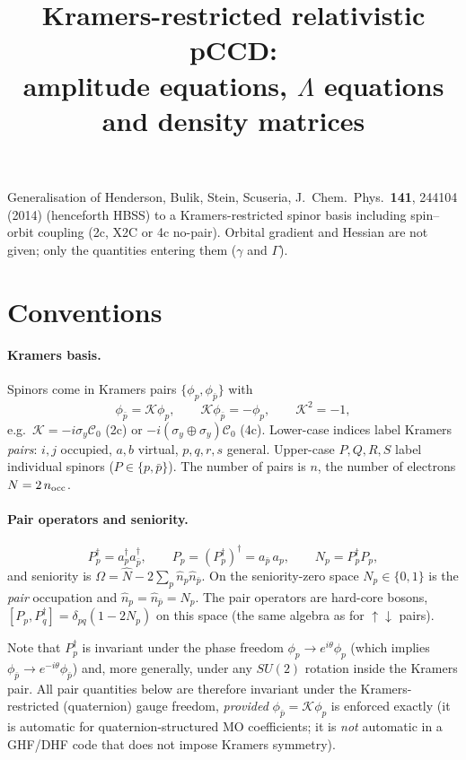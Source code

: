 \documentclass[11pt,a4paper]{article}
\title{Kramers-restricted relativistic pCCD:\\ amplitude equations, $\Lambda$ equations and density matrices}
\author{}
\date{}
\newcommand{\kb}[1]{\bar{#1}}                 %
\newcommand{\Pd}[1]{P^{\dagger}_{#1}}
\newcommand{\Pa}[1]{P_{#1}}
\begin{document}
\maketitle

\noindent Generalisation of Henderson, Bulik, Stein, Scuseria, J.~Chem.~Phys.~\textbf{141}, 244104 (2014)
(henceforth HBSS) to a Kramers-restricted spinor basis including spin--orbit coupling
(2c, X2C or 4c no-pair). Orbital gradient and Hessian are not given; only the quantities entering them
($\gamma$ and $\Gamma$).

\section{Conventions}

\paragraph{Kramers basis.}
Spinors come in Kramers pairs $\{\phi_p,\phi_{\kb p}\}$ with
\begin{equation}
  \phi_{\kb p} = \mathcal{K}\phi_p,\qquad \mathcal{K}\phi_{\kb p} = -\phi_p,\qquad \mathcal{K}^2=-1 ,
\end{equation}
e.g.\ $\mathcal{K}=-i\sigma_y\mathcal{C}_0$ (2c) or $-i(\sigma_y\oplus\sigma_y)\mathcal{C}_0$ (4c).
Lower-case indices label Kramers \emph{pairs}: $i,j$ occupied, $a,b$ virtual, $p,q,r,s$ general.
Upper-case $P,Q,R,S$ label individual spinors ($P\in\{p,\kb p\}$).
The number of pairs is $n$, the number of electrons $N=2\,n_{\rm occ}$.

\paragraph{Pair operators and seniority.}
\begin{equation}
  \Pd p = a^\dagger_p a^\dagger_{\kb p},\qquad
  \Pa p = (\Pd p)^\dagger = a_{\kb p}\,a_p,\qquad
  N_p = \Pd p\Pa p ,
\end{equation}
and seniority is $\Omega=\hat N-2\sum_p \hat n_p\hat n_{\kb p}$.
On the seniority-zero space $N_p\in\{0,1\}$ is the \emph{pair} occupation and
$\hat n_p=\hat n_{\kb p}=N_p$.
The pair operators are hard-core bosons,
$[\Pa p,\Pd q]=\delta_{pq}(1-2N_p)$ on this space (the same algebra as for $\uparrow\downarrow$ pairs).

Note that $\Pd p$ is invariant under the phase freedom $\phi_p\to e^{i\theta}\phi_p$
(which implies $\phi_{\kb p}\to e^{-i\theta}\phi_{\kb p}$) and, more generally, under any
$SU(2)$ rotation inside the Kramers pair. All pair quantities below are therefore invariant
under the Kramers-restricted (quaternion) gauge freedom, \emph{provided} $\phi_{\kb p}=\mathcal K\phi_p$
is enforced exactly (it is automatic for quaternion-structured MO coefficients; it is \emph{not}
automatic in a GHF/DHF code that does not impose Kramers symmetry).
\end{document}

